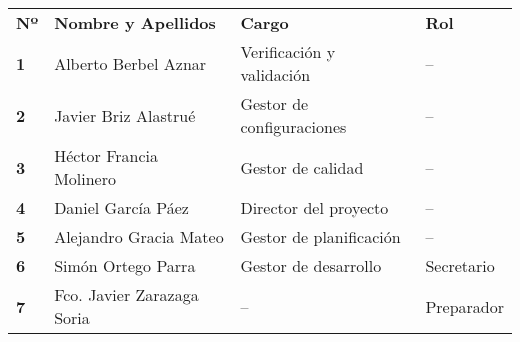 \begin{longtable}{ | C{\tabcolsep} |
                     L{\tabcolsep} |
                     C{\tabcolsep} |
                     C{\tabcolsep} | }
\hline %
 \\
\hline %
{\bf Nº} & {\bf Nombre y Apellidos} & {\bf Cargo} & {\bf Rol} \\
\hline %
{\bf 1} & Alberto Berbel Aznar & Verificación y validación & --  \\
\hline %
{\bf 2} & Javier Briz Alastrué & Gestor de configuraciones & --  \\
\hline %
{\bf 3} & Héctor Francia Molinero & Gestor de calidad & --  \\
\hline %
{\bf 4} & Daniel García Páez & Director del proyecto & -- \\
\hline %
{\bf 5} & Alejandro Gracia Mateo & Gestor de planificación & --  \\
\hline %
{\bf 6} & Simón Ortego Parra & Gestor de desarrollo & Secretario  \\
\hline %
{\bf 7} & Fco. Javier Zarazaga Soria & -- & Preparador  \\
\hline %
\end{longtable}

